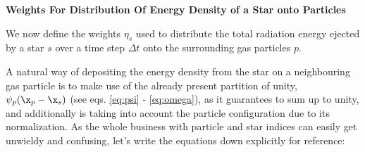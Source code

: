 % 
% 
% 
% 
% 
% 
% 
% 



\textbf{Weights For Distribution Of Energy Density of a Star onto Particles}


We now define the weights $\eta_s$ used to distribute the total radiation energy ejected by a star 
$s$ over a time step $\Delta t$ onto the surrounding gas particles $p$.


A natural way of depositing the energy density from the star on a neighbouring gas particle is to 
make use of the already present partition of unity, $\psi_p(\x_p - \x_s)$ (see eqs. 
\ref{eq:psi} - \ref{eq:omega}), as it guarantees to sum up to unity, and additionally is taking 
into account the particle configuration due to its normalization. As the whole business with 
particle and star indices can easily get unwieldy and confusing, let's write the equations down 
explicitly for reference:

